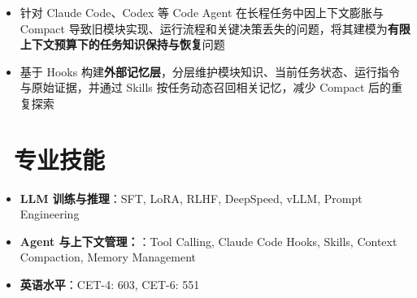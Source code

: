 \documentclass{resume}
\begin{document}
\hfill{}\par
\begin{itemize}
  \item 针对 Claude Code、Codex 等 Code Agent 在长程任务中因上下文膨胀与 Compact 导致旧模块实现、运行流程和关键决策丢失的问题，将其建模为\textbf{有限上下文预算下的任务知识保持与恢复}问题
  \item 基于 Hooks 构建\textbf{外部记忆层}，分层维护模块知识、当前任务状态、运行指令与原始证据，并通过 Skills 按任务动态召回相关记忆，减少 Compact 后的重复探索
\end{itemize}

\section{\ 专业技能}
\begin{itemize}[parsep=0.5ex]
  \item \textbf{LLM 训练与推理}：SFT, LoRA, RLHF, DeepSpeed, vLLM, Prompt Engineering
  \item \textbf{Agent 与上下文管理：}：Tool Calling, Claude Code Hooks, Skills, Context Compaction, Memory Management
  \item \textbf{英语水平}：CET-4: 603, CET-6: 551
\end{itemize}
\end{document}

